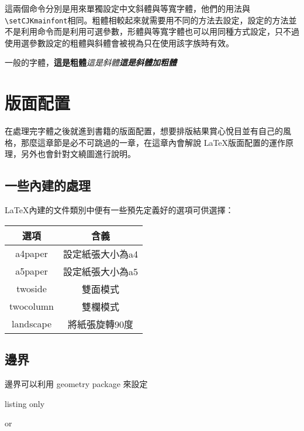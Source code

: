 這兩個命令分別是用來單獨設定中文斜體與等寬字體，他們的用法與\verb|\setCJKmainfont|相同。粗體相較起來就需要用不同的方法去設定，設定的方法並不是利用命令而是利用可選參數，形體與等寬字體也可以用同種方式設定，只不過使用選參數設定的粗體與斜體會被視為只在使用該字族時有效。

\begin{tcblisting}{}
一般的字體，\textbf{這是粗體}\textit{這是斜體}\textbf{\textit{這是斜體加粗體}}
\end{tcblisting}

\section{版面配置}

在處理完字體之後就進到書籍的版面配置，想要排版結果賞心悅目並有自己的風格，那麼這章節是必不可跳過的一章，在這章內會解說 \LaTeX 版面配置的運作原理，另外也會針對文繞圖進行說明。

\subsection{一些內建的處理}

\LaTeX 內建的文件類別中便有一些預先定義好的選項可供選擇：

\begin{tabular}{cc}
\hline
選項 & 含義 \\\hline\hline
a4paper & 設定紙張大小為a4 \\\hline
a5paper & 設定紙張大小為a5 \\\hline
twoside & 雙面模式 \\\hline
twocolumn & 雙欄模式 \\\hline
landscape & 將紙張旋轉90度 \\\hline
\end{tabular}

\subsection{邊界}

邊界可以利用 geometry package 來設定

\begin{tcblisting}{listing only}
\usepackage[key1=value, key2=value]{geometry}
or
\usepackage{geometry}
\geometry{key1=value, key2=value}
\end{tcblisting}

